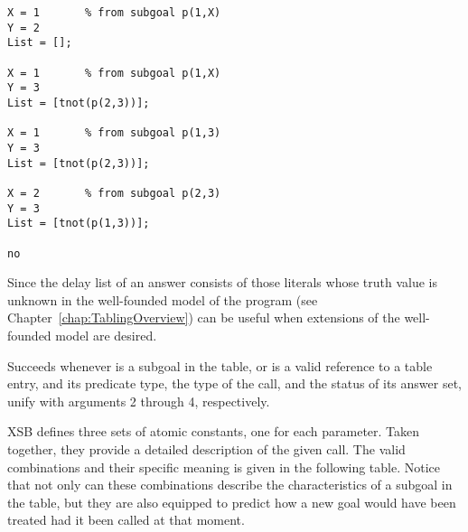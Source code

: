 \begin{description}
\begin{example}
\begin{center}
\begin{small}
\begin{minipage}{2.5in}
\begin{verbatim}
X = 1       % from subgoal p(1,X)
Y = 2
List = [];

X = 1       % from subgoal p(1,X)
Y = 3
List = [tnot(p(2,3))];

X = 1       % from subgoal p(1,3)
Y = 3
List = [tnot(p(2,3))];

X = 2       % from subgoal p(2,3)
Y = 3
List = [tnot(p(1,3))];

no
\end{verbatim}
\end{minipage}
\end{small}
\end{center}
\end{example}

Since the delay list of an answer consists of those literals whose
truth value is unknown in the well-founded model of the program (see
Chapter~\ref{chap:TablingOverview})  can be
useful when extensions of the well-founded model are desired.



\vspace{-5ex}

%
Succeeds whenever  is a subgoal in the table, or
 is a valid reference to a table entry, and its
predicate type, the type of the call, and the status of its answer
set, unify with arguments 2 through 4, respectively.

XSB defines three sets of atomic constants, one for each parameter.
Taken together, they provide a detailed description of the given call.
The valid combinations and their specific meaning is given in the
following table.  Notice that not only can these combinations describe
the characteristics of a subgoal in the table, but they are also
equipped to predict how a new goal would have been treated had it been
called at that moment.


\end{description}
